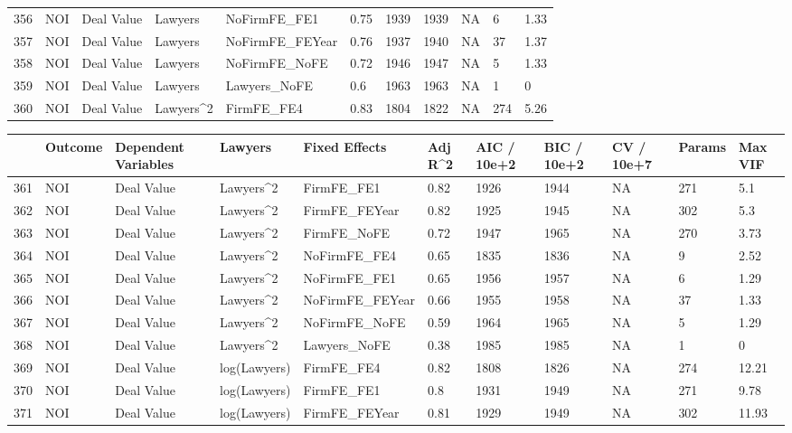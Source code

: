 \documentclass{article}
\begin{document}
\begin{table}[H]
\begin{tabular}{rllllllllll}
  356 & NOI & Deal Value & Lawyers & NoFirmFE\_FE1 & 0.75 & 1939 & 1939 & NA & 6 & 1.33 \\
  357 & NOI & Deal Value & Lawyers & NoFirmFE\_FEYear & 0.76 & 1937 & 1940 & NA & 37 & 1.37 \\
  358 & NOI & Deal Value & Lawyers & NoFirmFE\_NoFE & 0.72 & 1946 & 1947 & NA & 5 & 1.33 \\
  359 & NOI & Deal Value & Lawyers & Lawyers\_NoFE & 0.6 & 1963 & 1963 & NA & 1 & 0 \\
  360 & NOI & Deal Value & Lawyers^2 & FirmFE\_FE4 & 0.83 & 1804 & 1822 & NA & 274 & 5.26 \\
   \hline
\end{tabular}
\end{table}
\begin{table}[H]
\centering
\begin{tabular}{rllllllllll}
  \hline
 & Outcome & Dependent Variables & Lawyers & Fixed Effects & Adj R^2 & AIC / 10e+2 & BIC / 10e+2 & CV / 10e+7 & Params & Max VIF \\
  \hline
361 & NOI & Deal Value & Lawyers^2 & FirmFE\_FE1 & 0.82 & 1926 & 1944 & NA & 271 & 5.1 \\
  362 & NOI & Deal Value & Lawyers^2 & FirmFE\_FEYear & 0.82 & 1925 & 1945 & NA & 302 & 5.3 \\
  363 & NOI & Deal Value & Lawyers^2 & FirmFE\_NoFE & 0.72 & 1947 & 1965 & NA & 270 & 3.73 \\
  364 & NOI & Deal Value & Lawyers^2 & NoFirmFE\_FE4 & 0.65 & 1835 & 1836 & NA & 9 & 2.52 \\
  365 & NOI & Deal Value & Lawyers^2 & NoFirmFE\_FE1 & 0.65 & 1956 & 1957 & NA & 6 & 1.29 \\
  366 & NOI & Deal Value & Lawyers^2 & NoFirmFE\_FEYear & 0.66 & 1955 & 1958 & NA & 37 & 1.33 \\
  367 & NOI & Deal Value & Lawyers^2 & NoFirmFE\_NoFE & 0.59 & 1964 & 1965 & NA & 5 & 1.29 \\
  368 & NOI & Deal Value & Lawyers^2 & Lawyers\_NoFE & 0.38 & 1985 & 1985 & NA & 1 & 0 \\
  369 & NOI & Deal Value & log(Lawyers) & FirmFE\_FE4 & 0.82 & 1808 & 1826 & NA & 274 & 12.21 \\
  370 & NOI & Deal Value & log(Lawyers) & FirmFE\_FE1 & 0.8 & 1931 & 1949 & NA & 271 & 9.78 \\
  371 & NOI & Deal Value & log(Lawyers) & FirmFE\_FEYear & 0.81 & 1929 & 1949 & NA & 302 & 11.93 \\

\end{tabular}
\end{table}
\end{document}
